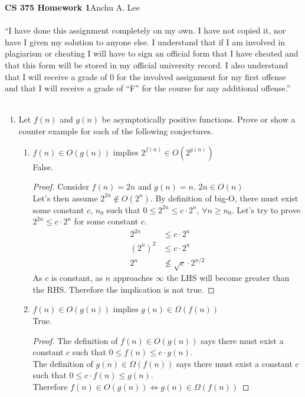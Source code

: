 \documentclass{article}
\begin{document}
        \noindent\textbf{CS 375 Homework 1}\hfill Anchu A. Lee
        \\\\“I have done this assignment completely on my own. I have not copied it, nor have I given my solution to anyone else. I understand that if I am involved in plagiarism or cheating I will have to sign an official form that I have cheated and that this form will be stored in my official university record. I also understand that I will receive a grade of 0 for the involved assignment for my first offense and that I will receive a grade of “F” for the course for any additional offense.” 
        \\\\
        \begin{enumerate}
            \item Let $f(n)$ and $g(n)$ be asymptotically positive functions. Prove or show a counter example for each of the following conjectures.
                \begin{enumerate}
                    \item $f(n)\in O(g(n))$ implies $2^{f(n)}\in O(2^{g(n)})$\\
                        False.
                        \begin{proof}
                            Consider $f(n) = 2n$ and $g(n) = n$.
                            $2n \in O(n)$\\
                            Let's then assume $2^{2n}\not\in O(2^{n})$. By definition of big-O, there must exist some constant $c$, $n_0$
                             such that $0\leq 2^{2n}\leq c\cdot 2^n$, $\forall n\geq n_0$. Let's try to prove $2^{2n}\leq c\cdot 2^n$ for some constant $c$.
                            \begin{align*}
                                2^{2n}&\leq c\cdot 2^n\\
                                (2^n)^2&\leq c\cdot 2^n\\
                                2^n&\not\leq \sqrt{c}\cdot 2^{n/2}
                            \end{align*}                      
                            As $c$ is constant, as $n$ approaches $\infty$ the LHS will become greater than the RHS. Therefore the implication is not true.
                        \end{proof}
                    \item $f(n)\in O(g(n))$ implies $g(n)\in\Omega(f(n))$\\
                        True.
                        \begin{proof}
                            The definition of $f(n)\in O(g(n))$ says there must exist a constant $c$ such that $0\leq f(n)\leq c\cdot g(n)$.\\
                            The definition of $g(n)\in\Omega(f(n))$ says there must exist a constant $c$ such that $0\leq c\cdot f(n)\leq g(n)$.\\
                            Therefore $f(n)\in O(g(n)) \Leftrightarrow g(n)\in\Omega(f(n))$


\end{proof}
\end{enumerate}
\end{enumerate}
\end{document}

